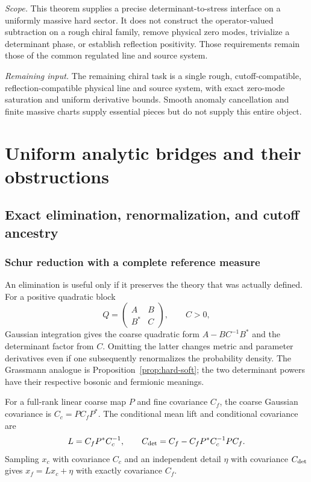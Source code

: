 \documentclass[11pt,a4paper,oneside]{book}
\theoremstyle{plain}
\theoremstyle{definition}
\theoremstyle{remark}
\newcommand{\src}[2]{\cite{#1}}
\newcommand{\scope}[1]{\par\smallskip\noindent\textit{Scope.} #1\par\smallskip}
\newcommand{\gate}[1]{\par\smallskip\noindent\textit{Remaining input.} #1\par\smallskip}
\begin{document}
\scope{This theorem supplies a precise determinant-to-stress interface
on a uniformly massive hard sector.  It does not construct the
operator-valued subtraction on a rough chiral family, remove physical
zero modes, trivialize a determinant phase, or establish reflection
positivity.  Those requirements remain those of the common regulated
line and source system.}


\gate{The remaining chiral task is a single rough, cutoff-compatible, reflection-compatible physical line and source system, with exact zero-mode saturation and uniform derivative bounds. Smooth anomaly cancellation and finite massive charts supply essential pieces but do not supply this entire object.}


\part{Uniform analytic bridges and their obstructions}
\chapter{Exact elimination, renormalization, and cutoff ancestry}
\label{ch:rg}
\section{Schur reduction with a complete reference measure}
An elimination is useful only if it preserves the theory that was actually defined. For a positive quadratic block
\begin{equation}
 Q=\begin{pmatrix}A&B\\B^*&C\end{pmatrix},\qquad C>0,
\end{equation}
Gaussian integration gives the coarse quadratic form $A-BC^{-1}B^*$ and the determinant factor from $C$. Omitting the latter changes metric and parameter derivatives even if one subsequently renormalizes the probability density. The Grassmann analogue is Proposition~\ref{prop:hard-soft}; the two determinant powers have their respective bosonic and fermionic meanings. \src{R4}{thm:v4v1-Schur-shell}

For a full-rank linear coarse map $P$ and fine covariance $C_f$, the coarse Gaussian covariance is $C_c=PC_fP^*$. The conditional mean lift and conditional covariance are
\begin{equation}
 L=C_fP^*C_c^{-1},\qquad
 C_{\rm det}=C_f-C_fP^*C_c^{-1}PC_f.
 \label{eq:gaussian-lift}
\end{equation}
Sampling $x_c$ with covariance $C_c$ and an independent detail $\eta$ with covariance $C_{\rm det}$ gives $x_f=Lx_c+\eta$ with exactly covariance $C_f$.
\end{document}
